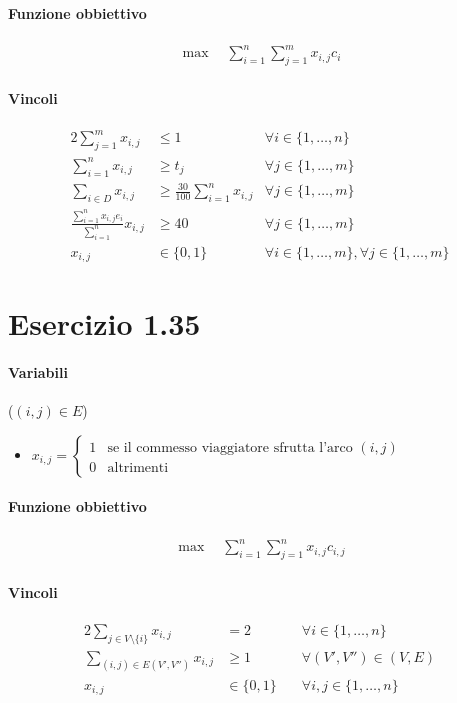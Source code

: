 \documentclass{article}
\begin{document}
\paragraph{Funzione obbiettivo}
\begin{align*}
  \max \quad \sum_{i=1}^n \sum_{j=1}^m x_{i,j} c_i
\end{align*}

\paragraph{Vincoli}
\begin{alignat}{2}
  \sum_{j=1}^m x_{i,j} &\leq 1 &\forall i \in \{1,\ldots,n\} \\
  \sum_{i=1}^n x_{i,j} &\geq t_j &\forall j \in \{1,\ldots,m\} \\
  \sum_{i \in D} x_{i,j} &\geq \frac{30}{100} \sum_{i=1}^n x_{i,j} &\forall j \in \{1,\ldots,m\} \\
  \frac{\sum_{i=1}^n x_{i,j}e_i}{\sum_{i=1}^n} x_{i,j} &\geq 40 &\forall j \in \{1,\ldots,m\} \\
  x_{i,j} &\in \{0,1\} \quad &\forall i \in \{1,\ldots,m\}, \forall j \in \{1,\ldots,m\}
\end{alignat}

\pagebreak
\section{Esercizio 1.35}

\paragraph{Variabili} ($(i,j) \in E$)
\begin{itemize}
  \item $x_{i,j} = \begin{cases}
    1 &\text{se il commesso viaggiatore sfrutta l'arco }(i,j)\\
    0 &\text{altrimenti}
  \end{cases}$
\end{itemize}

\paragraph{Funzione obbiettivo}
\begin{align*}
  \max \quad \sum_{i=1}^n \sum_{j=1}^n x_{i,j} c_{i,j}
\end{align*}

\paragraph{Vincoli}
\begin{alignat}{2}
  \sum_{j \in V \setminus \{i\}} x_{i,j} &= 2 &\forall i \in \{1,\ldots,n\} \\
  \sum_{(i,j) \in E(V', V'')} x_{i,j} &\geq 1 &\forall (V', V'') \in (V, E) \\
  x_{i,j} &\in \{0,1\} \quad &\forall i,j \in \{1,\ldots,n\}
\end{alignat}
\end{document}
